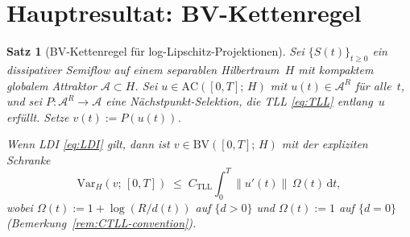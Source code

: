 \documentclass[12pt,a4paper]{article}
\theoremstyle{definition}
\theoremstyle{plain}
\newtheorem{theorem}[definition]{Satz}
\theoremstyle{remark}
\newcommand{\Var}{\mathrm{Var}}
\newcommand{\AC}{\mathrm{AC}}
\newcommand{\BV}{\mathrm{BV}}
\begin{document}
\section{Hauptresultat: BV-Kettenregel}
\label{sec:main}

\begin{theorem}[BV-Kettenregel für log-Lipschitz-Projektionen]
\label{thm:BV-chain}
Sei $\{S(t)\}_{t \ge 0}$ ein dissipativer Semiflow auf einem
separablen Hilbertraum~$H$ mit kompaktem globalem Attraktor
$\mathcal{A} \subset H$.  Sei $u \in \AC([0,T];\, H)$ mit
$u(t) \in \mathcal{A}^R$ für alle~$t$, und sei
$P: \mathcal{A}^R \to \mathcal{A}$ eine Nächstpunkt-Selektion,
die TLL \eqref{eq:TLL} entlang~$u$ erfüllt.  Setze $v(t) := P(u(t))$.

Wenn LDI \eqref{eq:LDI} gilt, dann ist
$v \in \BV([0,T];\, H)$ mit der expliziten Schranke
\begin{equation}\label{eq:BV-bound}
  \Var_H(v;\,[0,T])
  \;\le\;
  C_{\mathrm{TLL}}
  \int_0^T \|u'(t)\|\,\Omega(t)\,\mathrm{d}t,
\end{equation}
wobei $\Omega(t) := 1 + \log(R/d(t))$ auf $\{d > 0\}$ und
$\Omega(t) := 1$ auf $\{d = 0\}$
(Bemerkung~\ref{rem:CTLL-convention}).
\end{theorem}
\end{document}
